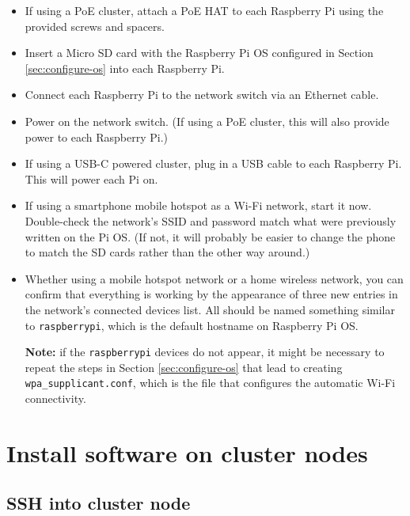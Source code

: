 \documentclass{article}
\begin{document}
\begin{itemize}
    \item If using a PoE cluster, attach a PoE HAT to each Raspberry Pi using the provided screws and spacers. 
    
    \item Insert a Micro SD card with the Raspberry Pi OS configured in Section \ref{sec:configure-os} into each Raspberry Pi.
    
    \item Connect each Raspberry Pi to the network switch via an Ethernet cable. 
    
    \item Power on the network switch. (If using a PoE cluster, this will also provide power to each Raspberry Pi.)
    
    \item If using a USB-C powered cluster, plug in a USB cable to each Raspberry Pi. This will power each Pi on.
    
    \item If using a smartphone mobile hotspot as a Wi-Fi network, start it now. Double-check the network's SSID and password match what were previously written on the Pi OS. (If not, it will probably be easier to change the phone to match the SD cards rather than the other way around.)
    
    \item Whether using a mobile hotspot network or a home wireless network, you can confirm that everything is working by the appearance of three new entries in the network's connected devices list. All should be named something similar to \texttt{raspberrypi}, which is the default hostname on Raspberry Pi OS.
    
    \textbf{Note:} if the \texttt{raspberrypi} devices do not appear, it might be necessary to repeat the steps in Section \ref{sec:configure-os} that lead to creating \texttt{wpa\_supplicant.conf}, which is the file that configures the automatic Wi-Fi connectivity. 
\end{itemize}

\section{Install software on cluster nodes}

\subsection{SSH into cluster node}
\end{document}
